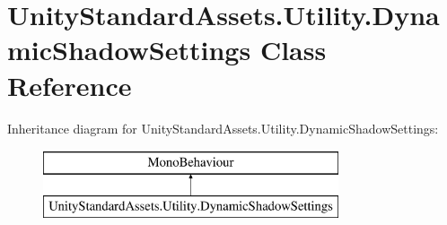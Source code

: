 \hypertarget{class_unity_standard_assets_1_1_utility_1_1_dynamic_shadow_settings}{}\section{Unity\+Standard\+Assets.\+Utility.\+Dynamic\+Shadow\+Settings Class Reference}
\label{class_unity_standard_assets_1_1_utility_1_1_dynamic_shadow_settings}
Inheritance diagram for Unity\+Standard\+Assets.\+Utility.\+Dynamic\+Shadow\+Settings\+:\begin{figure}[H]
\begin{center}
\leavevmode
\includegraphics[height=2.000000cm]{class_unity_standard_assets_1_1_utility_1_1_dynamic_shadow_settings}
\end{center}
\end{figure}
